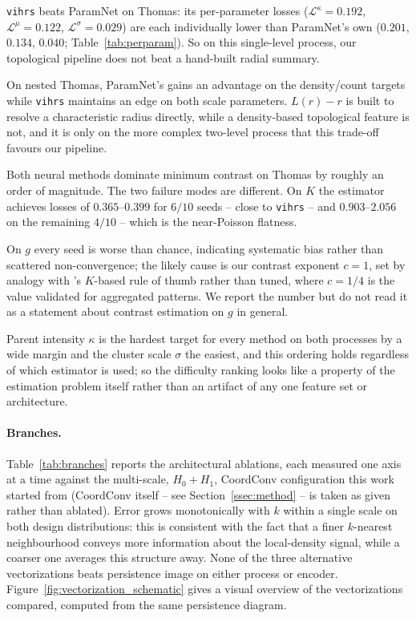 \documentclass[11pt,a4paper]{article}
\theoremstyle{definitioncolon}
\begin{document}
\texttt{vihrs} beats ParamNet on Thomas: its per-parameter losses
($\mathcal{L}^\kappa=0.192$, $\mathcal{L}^\mu=0.122$,
$\mathcal{L}^\sigma=0.029$) are each individually lower than
ParamNet's own ($0.201$, $0.134$, $0.040$; Table~\ref{tab:perparam}).
So on this single-level process, our topological pipeline does not beat a
hand-built radial summary.

On nested
Thomas, ParamNet's gains an advantage on the density/count targets while
\texttt{vihrs} maintains an edge on both scale parameters. $L(r)-r$ is built to
resolve a characteristic radius directly, while a density-based topological
feature is not, and it is only on the more complex two-level process that this
trade-off favours our pipeline.

Both neural methods dominate minimum contrast on Thomas by roughly
an order of magnitude. The two failure modes are different. On $K$ the estimator achieves losses of $0.365$--$0.399$ for $6/10$ seeds -- close to \texttt{vihrs} -- and $0.903$--$2.056$ on the remaining $4/10$ -- which is the near-Poisson flatness.

On $g$ every seed is worse than chance, indicating
systematic bias rather than scattered non-convergence; the likely cause is our
contrast exponent $c=1$, set by analogy with \citet{diggle2003spatial}'s
$K$-based rule of thumb rather than tuned, where $c=1/4$ is the value validated
for aggregated patterns. We report the number but do not read it as a statement
about contrast estimation on $g$ in general.

Parent intensity $\kappa$ is the hardest target
for every method on both processes by a wide margin and the cluster scale $\sigma$ the
easiest, and this ordering holds
regardless of which estimator is used; so the difficulty ranking looks like a
property of the estimation problem itself rather than
an artifact of any one feature set or architecture.

\paragraph{Branches.} Table~\ref{tab:branches} reports the architectural ablations, each
measured one axis at a time against the multi-scale, $H_0{+}H_1$, CoordConv
configuration this work started from (CoordConv itself -- see
Section~\ref{ssec:method} -- is taken as given rather than ablated). Error grows monotonically with $k$ within a single
scale on both design
distributions: this is consistent with the fact that a finer $k$-nearest neighbourhood
conveys more information about the local-density signal, while a coarser one averages this structure away.
None of
the three alternative vectorizations beats
persistence image on either process or encoder.
Figure~\ref{fig:vectorization_schematic} gives a visual overview of the
vectorizations compared, computed from the same persistence diagram.
\end{document}
